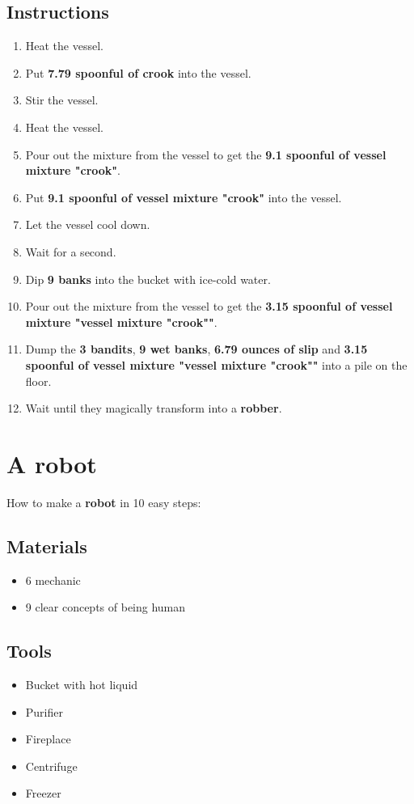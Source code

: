 \documentclass{article}
\begin{document}
\subsection{Instructions}\begin{enumerate}
\item 
Heat the vessel.
\item 
Put \textbf{7.79 spoonful of crook} into the vessel.
\item 
Stir the vessel.
\item 
Heat the vessel.
\item 
Pour out the mixture from the vessel to get the \textbf{9.1 spoonful of vessel mixture "crook"}.
\item 
Put \textbf{9.1 spoonful of vessel mixture "crook"} into the vessel.
\item 
Let the vessel cool down.
\item 
Wait for a second.
\item 
Dip \textbf{9 banks} into the bucket with ice-cold water.
\item 
Pour out the mixture from the vessel to get the \textbf{3.15 spoonful of vessel mixture "vessel mixture "crook""}.
\item 
Dump the \textbf{3 bandits}, \textbf{9 wet banks}, \textbf{6.79 ounces of slip} and \textbf{3.15 spoonful of vessel mixture "vessel mixture "crook""} into a pile on the floor.
\item 
Wait until they magically transform into a \textbf{robber}.
\end{enumerate}
\newpage
\section{A robot}How to make a \textbf{robot} in 10 easy steps:

\subsection{Materials}\begin{itemize}
\item 
6 mechanic
\item 
9 clear concepts of being human
\end{itemize}
\subsection{Tools}\begin{itemize}
\item 
Bucket with hot liquid
\item 
Purifier
\item 
Fireplace
\item 
Centrifuge
\item 
Freezer
\end{itemize}
\end{document}
